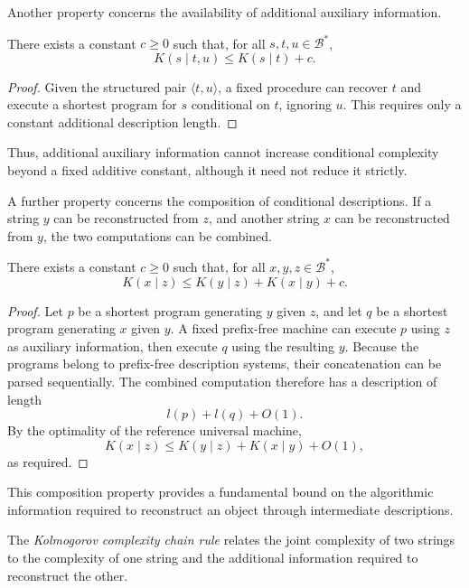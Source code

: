 Another property concerns the availability of additional auxiliary information.

\begin{proposition}
\label{prop:conditional-background}
There exists a constant $c\geq 0$ such that, for all $s,t,u\in\mathcal{B}^*$,
\[
K(s\mid t,u)\leq K(s\mid t)+c.
\]
\end{proposition}
\begin{proof}
Given the structured pair $\langle t,u\rangle$, a fixed procedure can recover $t$ and execute a shortest program for $s$ conditional on $t$, ignoring $u$. This requires only a constant additional description length.
\end{proof}

Thus, additional auxiliary information cannot increase conditional complexity beyond a fixed additive constant, although it need not reduce it strictly.

A further property concerns the composition of conditional descriptions. If a string $y$ can be reconstructed from $z$, and another string $x$ can be reconstructed from $y$, the two computations can be combined.

\begin{proposition}
\label{prop:conditional-composition}
There exists a constant $c\geq 0$ such that, for all $x,y,z\in\mathcal{B}^*$,
\[
K(x\mid z)\leq
K(y\mid z)+K(x\mid y)+c.
\]
\end{proposition}
\begin{proof}
Let $p$ be a shortest program generating $y$ given $z$, and let $q$ be a shortest program generating $x$ given $y$. A fixed prefix-free machine can execute $p$ using $z$ as auxiliary information, then execute $q$ using the resulting $y$. Because the programs belong to prefix-free description systems, their concatenation can be parsed sequentially. The combined computation therefore has a description of length
\[
l(p)+l(q)+O(1).
\]
By the optimality of the reference universal machine,
\[
K(x\mid z) \leq K(y\mid z) + K(x\mid y) + O(1),
\]
as required.
\end{proof}

This composition property provides a fundamental bound on the algorithmic information required to reconstruct an object through intermediate descriptions.

The \emph{Kolmogorov complexity chain rule} relates the joint complexity of two strings to the complexity of one string and the additional information required to reconstruct the other.

